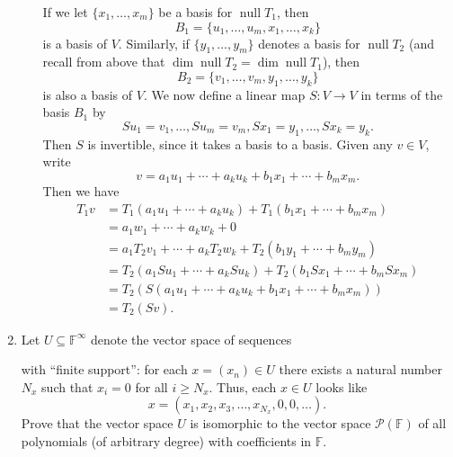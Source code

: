 \documentclass[letterpaper,12pt]{article}
\DeclareMathOperator{\nul}{null}
\begin{document}
\begin{enumerate}
\begin{enumerate}
If we let $\{x_1,\ldots, x_m\}$ be a basis for $\nul T_1$, then
\[
 B_1 = \{u_1,\ldots, u_m, x_1,\ldots, x_k\}
\]
is a basis of $V$. Similarly, if $\{y_1,\ldots, y_m\}$ denotes a basis for $\nul T_2$ (and recall from above that $\dim \nul T_2 = \dim \nul T_1$), then
\[
 B_2 = \{v_1,\ldots, v_m,y_1,\ldots, y_k\}
\]
is also a basis of $V$. We now define a linear map $S:V\to V$ in terms of the basis $B_1$ by
\[
 Su_1=v_1,\ldots, Su_m=v_m,Sx_1=y_1,\ldots, Sx_k=y_k.
\]
Then $S$ is invertible, since it takes a basis to a basis. Given any $v\in V$, write
\[
 v = a_1u_1+\cdots + a_ku_k+b_1x_1+\cdots +b_mx_m.
\]
Then we have
\begin{align*}
 T_1v & = T_1(a_1u_1+\cdots + a_ku_k)+T_1(b_1x_1+\cdots + b_mx_m)\\
& = a_1w_1+\cdots + a_kw_k + 0\\
& = a_1T_2v_1+\cdots + a_kT_2w_k + T_2(b_1y_1+\cdots + b_my_m)\\
& = T_2(a_1Su_1+\cdots +a_kSu_k)+T_2(b_1Sx_1+\cdots + b_mSx_m)\\
& = T_2(S(a_1u_1+\cdots+a_ku_k+b_1x_1+\cdots + b_mx_m))\\
& = T_2(Sv).
\end{align*}



\bigskip

\end{enumerate}


 \item Let $U\subseteq \mathbb{F}^\infty$ denote the vector space of sequences

with ``finite support'': for each $x=(x_n)\in U$ there exists a natural number $N_x$ such that $x_i=0$ for all $i\geq N_x$. Thus, each $x\in U$ looks like
\[
 x = (x_1,x_2,x_3,\ldots, x_{N_x}, 0, 0, \ldots).
\]
Prove that the vector space $U$ is isomorphic to the vector space $\mathcal{P}(\mathbb{F})$ of all polynomials (of arbitrary degree) with coefficients in $\mathbb{F}$.

\bigskip


\end{enumerate}
\end{document}
